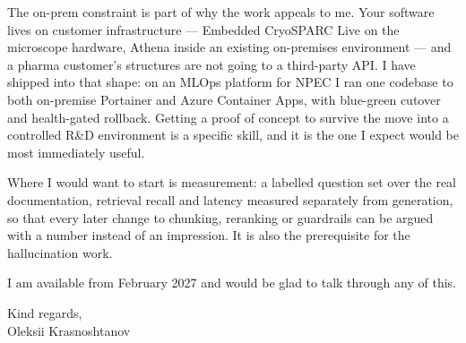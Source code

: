 \documentclass[letterpaper,11pt]{article}
\begin{document}
The on-prem constraint is part of why the work appeals to me. Your software
lives on customer infrastructure --- Embedded CryoSPARC Live on the microscope
hardware, Athena inside an existing on-premises environment --- and a pharma
customer's structures are not going to a third-party API. I have shipped into
that shape: on an MLOps platform for NPEC I ran one codebase to both on-premise
Portainer and Azure Container Apps, with blue-green cutover and health-gated
rollback. Getting a proof of concept to survive the move into a controlled R\&D
environment is a specific skill, and it is the one I expect would be most
immediately useful.

Where I would want to start is measurement: a labelled question set over the
real documentation, retrieval recall and latency measured separately from
generation, so that every later change to chunking, reranking or guardrails can
be argued with a number instead of an impression. It is also the prerequisite
for the hallucination work.

I am available from February 2027 and would be glad to talk through any of this.

\vspace{10pt}

Kind regards, \\
\vspace{2pt}
Oleksii Krasnoshtanov
\end{document}
